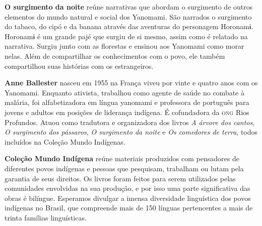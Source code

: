 \textbf{O surgimento da noite} reúne narrativas que abordam o surgimento de outros elementos
do mundo natural e social dos Yanomami. São narrados o surgimento do tabaco, do cipó e da banana através
das aventuras do personagem Horonamɨ. Horonamɨ é um grande pajé que surgiu de si mesmo, 
assim como é relatado na narrativa. Surgiu junto com as florestas e ensinou aos Yanomami 
como morar nelas. Além de compartilhar os conhecimentos com o povo, ele também
compartilhou suas histórias com os estrangeiros.

\textbf{Anne Ballester} nasceu em 1955 na França viveu por vinte e quatro anos com os Yanomami. 
Enquanto ativista, trabalhou como agente de saúde no combate à malária, foi alfabetizadora em língua 
yanomami e professora de português para jovens e adultos em posições de liderança indígena. É cofundadora da \textsc{ong} Rios Profundos. Atuou como tradutora e organizadora dos livros \textit{A árvore dos cantos}, \textit{O surgimento dos pássaros}, \textit{O surgimento da noite} e \textit{Os comedores de terra}, todos incluídos na Coleção Mundo Indígenas.

\textbf{Coleção Mundo Indígena} reúne materiais produzidos com pensadores de diferentes povos indígenas e pessoas que pesquisam, trabalham ou lutam pela garantia de seus direitos. Os livros foram feitos para serem utilizados pelas comunidades envolvidas na sua produção, e por isso uma parte significativa das obras é bilíngue. Esperamos divulgar a imensa diversidade linguística dos povos indígenas no Brasil, que compreende mais de 150 línguas pertencentes a mais de trinta famílias linguísticas.



